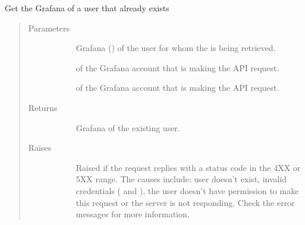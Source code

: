 \documentclass[letterpaper,10pt,english]{sphinxmanual}
\begin{document}
\begin{fulllineitems}
\label{\detokenize{grafanaAPI:grafanaAPI.getExistingUserId}}
Get the Grafana  of a user that already exists
\begin{quote}\begin{description}
\item[{Parameters}] \leavevmode\begin{description}
\item[{}] \leavevmode{[}\sphinxtitleref{str}{]}
Grafana () of the user for whom the  is being retrieved.

\item[{}] \leavevmode{[}\sphinxtitleref{str}{]}
 of the Grafana account that is making the API request.

\item[{}] \leavevmode{[}\sphinxtitleref{str}{]}
 of the Grafana account that is making the API request.

\end{description}

\item[{Returns}] \leavevmode\begin{description}
\item[{}] \leavevmode{[}\sphinxtitleref{int}{]}
Grafana  of the existing user.

\end{description}

\item[{Raises}] \leavevmode\begin{description}
\item[{}] \leavevmode
Raised if the request replies with a status code in the 4XX or 5XX range.
The causes include: user doesn’t exist, invalid credentials ( and
), the user doesn’t have permission to make this request or the
server is not responding. Check the error messages for more information.

\end{description}


\end{description}
\end{quote}
\end{fulllineitems}
\end{document}

